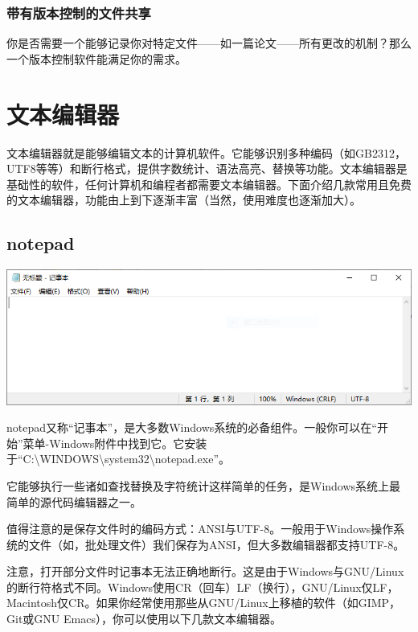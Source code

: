 \subsubsection{带有版本控制的文件共享}
你是否需要一个能够记录你对特定文件——如一篇论文——所有更改的机制？那么一个版本控制软件能满足你的需求。
\section{文本编辑器}
文本编辑器就是能够编辑文本的计算机软件。它能够识别多种编码（如GB2312，UTF8等等）和断行格式，提供字数统计、语法高亮、替换等功能。文本编辑器是基础性的软件，任何计算机和编程者都需要文本编辑器。下面介绍几款常用且免费的文本编辑器，功能由上到下逐渐丰富（当然，使用难度也逐渐加大）。
\subsection{notepad}
\begin{center}
\includegraphics[scale=0.8]{pic/winnotepad.PNG}	
\end{center} \par
notepad又称“记事本”，是大多数Windows系统的必备组件。一般你可以在“开始”菜单-Windows附件中找到它。它安装于“C:\textbackslash WINDOWS\textbackslash system32\textbackslash notepad.exe”。\par
它能够执行一些诸如查找替换及字符统计这样简单的任务，是Windows系统上最简单的源代码编辑器之一。\par
值得注意的是保存文件时的编码方式：ANSI与UTF-8。一般用于Windows操作系统的文件（如，批处理文件）我们保存为ANSI，但大多数编辑器都支持UTF-8。\par
注意，打开部分文件时记事本无法正确地断行。这是由于Windows与GNU/Linux的断行符格式不同。Windows使用CR（回车）LF（换行），GNU/Linux仅LF，Macintosh仅CR。如果你经常使用那些从GNU/Linux上移植的软件（如GIMP，Git或GNU Emacs），你可以使用以下几款文本编辑器。
